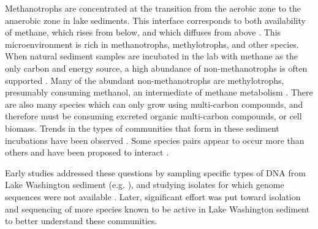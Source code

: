 Methanotrophs are concentrated at the transition from the aerobic zone to the anaerobic zone in lake sediments.
This interface corresponds to both availability of methane, which rises from below, and  which diffuses from above \cite{lidstrom1984gradients, kuivilal1988, auman2000gradients}. %
This microenvironment is rich in methanotrophs, methylotrophs, and other species.
When natural sediment samples are incubated in the lab with methane as the only carbon and energy source, a high abundance of non-methanotrophs is often supported \cite{oshkin2015LW}.
Many of the abundant non-methanotrophs are methylotrophs, presumably consuming methanol, an intermediate of methane metabolism \cite{krause2017}.
There are also many species which can only grow using multi-carbon compounds, and therefore must be consuming excreted organic multi-carbon compounds, or cell biomass.
Trends in the types of communities that form in these sediment incubations have been observed  \cite{oshkin2015LW}.
Some species pairs appear to occur more than others and have been proposed to interact \cite{krause2017}.

Early studies addressed these questions by sampling specific types of DNA from Lake Washington sediment (e.g. \cite{auman2002, costello2002, nercessian2005}), and studying isolates for which genome sequences were not available \cite{auman2000gradients, kalyuzhnaya2005Methylosarcina, kalyuzhnaya2006methylotenera}.
Later, significant effort was put toward isolation and sequencing of more species known to be active in Lake Washington sediment \cite{kalyuzhnaya2011isolates, beck2015isolates, mctaggart2015, kalyuzhnaya2015} to better understand these communities.

